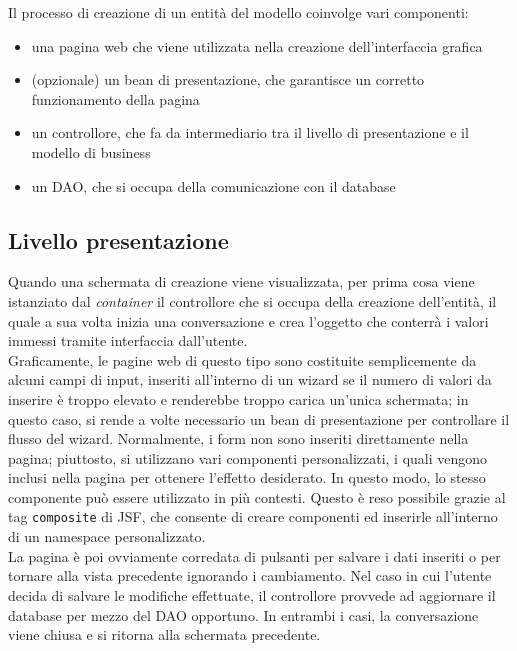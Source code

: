 
Il processo di creazione di un entità del modello coinvolge vari componenti:

\begin{itemize}
\item una pagina web che viene utilizzata nella creazione dell'interfaccia grafica
\item (opzionale) un bean di presentazione, che garantisce un corretto funzionamento della pagina
\item un controllore, che fa da intermediario tra il livello di presentazione e il modello di business
\item un DAO, che si occupa della comunicazione con il database
\end{itemize}

\subsection{Livello presentazione}

Quando una schermata di creazione viene visualizzata, per prima cosa viene istanziato dal \textit{container} il controllore che si occupa della creazione dell'entità, il quale a sua volta inizia una conversazione e crea l'oggetto che conterrà i valori immessi tramite interfaccia dall'utente.\\
Graficamente, le pagine web di questo tipo sono costituite semplicemente da alcuni campi di input, inseriti all'interno di un wizard se il numero di valori da inserire è troppo elevato e renderebbe troppo carica un'unica schermata; in questo caso, si rende a volte necessario un bean di presentazione per controllare il flusso del wizard. Normalmente, i form non sono inseriti direttamente nella pagina; piuttosto, si utilizzano vari componenti personalizzati, i quali vengono inclusi nella pagina per ottenere l'effetto desiderato. In questo modo, lo stesso componente può essere utilizzato in più contesti. Questo è reso possibile grazie al tag \lstinline{composite} di JSF, che consente di creare componenti ed inserirle all'interno di un namespace personalizzato.\\
La pagina è poi ovviamente corredata di pulsanti per salvare i dati inseriti o per tornare alla vista precedente ignorando i cambiamento. Nel caso in cui l'utente decida di salvare le modifiche effettuate, il controllore provvede ad aggiornare il database per mezzo del DAO opportuno. In entrambi i casi, la conversazione viene chiusa e si ritorna alla schermata precedente.